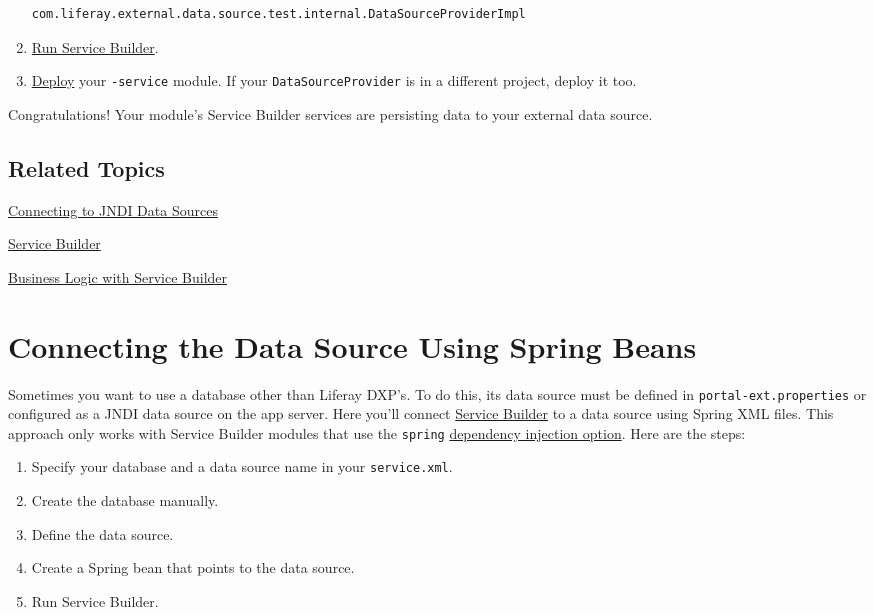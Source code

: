 \begin{enumerate}
\begin{verbatim}
com.liferay.external.data.source.test.internal.DataSourceProviderImpl
\end{verbatim}
\item
  \href{/docs/7-2/appdev/-/knowledge_base/a/running-service-builder}{Run
  Service Builder}.
\item
  \href{/docs/7-2/reference/-/knowledge_base/r/deploying-a-project}{Deploy}
  your \texttt{-service} module. If your \texttt{DataSourceProvider} is
  in a different project, deploy it too.
\end{enumerate}

Congratulations! Your module's Service Builder services are persisting
data to your external data source.

\section{Related Topics}\label{related-topics-15}

\href{/docs/7-2/appdev/-/knowledge_base/a/connecting-to-data-sources-using-jndi}{Connecting
to JNDI Data Sources}

\href{/docs/7-2/appdev/-/knowledge_base/a/service-builder}{Service
Builder}

\href{/docs/7-2/appdev/-/knowledge_base/a/business-logic-with-service-builder}{Business
Logic with Service Builder}

\chapter{Connecting the Data Source Using Spring
Beans}\label{connecting-the-data-source-using-spring-beans}

Sometimes you want to use a database other than Liferay DXP's. To do
this, its data source must be defined in \texttt{portal-ext.properties}
or configured as a JNDI data source on the app server. Here you'll
connect
\href{/docs/7-2/appdev/-/knowledge_base/a/service-builder}{Service
Builder} to a data source using Spring XML files. This approach only
works with Service Builder modules that use the \texttt{spring}
\href{/docs/7-2/appdev/-/knowledge_base/a/defining-global-service-information\#dependency-injector}{dependency
injection option}. Here are the steps:

\begin{enumerate}
\def\labelenumi{\arabic{enumi}.}
\item
  Specify your database and a data source name in your
  \texttt{service.xml}.
\item
  Create the database manually.
\item
  Define the data source.
\item
  Create a Spring bean that points to the data source.
\item
  Run Service Builder.
\end{enumerate}

